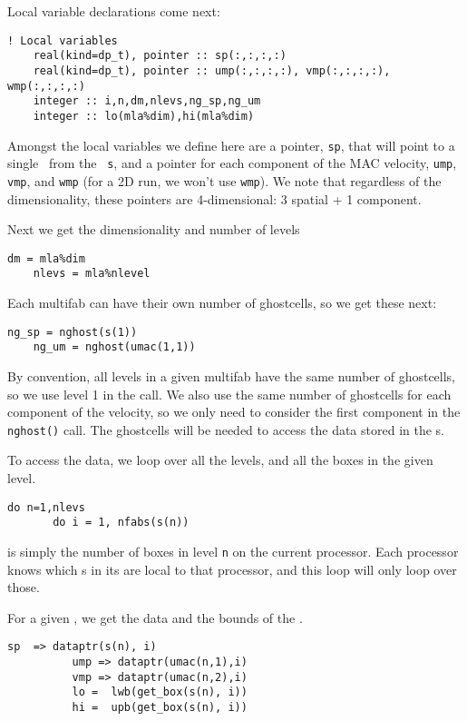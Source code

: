 Local variable declarations come next:
\begin{lstlisting}[language={[95]fortran},mathescape=false]
    ! Local variables
    real(kind=dp_t), pointer :: sp(:,:,:,:)
    real(kind=dp_t), pointer :: ump(:,:,:,:), vmp(:,:,:,:), wmp(:,:,:,:)
    integer :: i,n,dm,nlevs,ng_sp,ng_um
    integer :: lo(mla%dim),hi(mla%dim)
\end{lstlisting}

\noindent Amongst the local variables we define here are a pointer,
{\tt sp}, that will point to a single \fab\ from the
\multifab\ {\tt s}, and a pointer for each component of the MAC
velocity, {\tt ump}, {\tt vmp}, and {\tt wmp} (for a 2D run,
we won't use {\tt wmp}).  We note that regardless of the dimensionality,
these pointers are 4-dimensional: 3 spatial + 1 component.

Next we get the dimensionality and number of levels
\begin{lstlisting}[language={[95]fortran},mathescape=false]
    dm = mla%dim
    nlevs = mla%nlevel
\end{lstlisting}


Each multifab can have their own number of ghostcells, so we get
these next:
\begin{lstlisting}[language={[95]fortran},mathescape=false]
    ng_sp = nghost(s(1))
    ng_um = nghost(umac(1,1))
\end{lstlisting}
By convention, all levels in a given multifab have the same number of
ghostcells, so we use level 1 in the  call.  We also use
the same number of ghostcells for each component of the velocity, so
we only need to consider the first component in the {\tt nghost()}
call.  The ghostcells will be needed to access the data stored in the
\fab s.

To access the data, we loop over all the levels, and all the boxes in
the given level.
\begin{lstlisting}[language={[95]fortran},mathescape=false]
    do n=1,nlevs
       do i = 1, nfabs(s(n))
\end{lstlisting}
 is simply the number of boxes in level {\tt n} on
the current processor.  Each processor knows which \fab s in its
\multifab are local to that processor, and this loop will only loop
over those.

For a given \boxtype, we get the data and the bounds of the \boxtype.
\begin{lstlisting}[language={[95]fortran},mathescape=false]
          sp  => dataptr(s(n), i)
          ump => dataptr(umac(n,1),i)
          vmp => dataptr(umac(n,2),i)
          lo =  lwb(get_box(s(n), i))
          hi =  upb(get_box(s(n), i))
\end{lstlisting}


